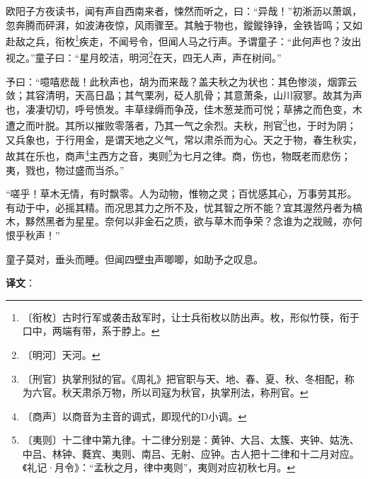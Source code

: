 \documentclass[12pt,UTF-8,openany,a4]{ctexbook}
\begin{document}
\begin{large}
    
    欧阳子方夜读书，闻有声自西南来者，悚然而听之，曰：“异哉！”初淅沥以萧飒，忽奔腾而砰湃，如波涛夜惊，风雨骤至。其触于物也，鏦鏦铮铮，金铁皆鸣；又如赴敌之兵，衔枚\footnote{〔衔枚〕\yiwen 古时行军或袭击敌军时，让士兵衔枚以防出声。枚，形似竹筷，衔于口中，两端有带，系于脖上。}疾走，不闻号令，但闻人马之行声。予谓童子：“此何声也？汝出视之。”童子曰：“星月皎洁，明河\footnote{〔明河〕\yiwen 天河。}在天，四无人声，声在树间。”
    
    予曰：“噫嘻悲哉！此秋声也，胡为而来哉？盖夫秋之为状也：其色惨淡，烟霏云敛；其容清明，天高日晶；其气栗冽，砭人肌骨；其意萧条，山川寂寥。故其为声也，凄凄切切，呼号愤发。丰草绿缛而争茂，佳木葱茏而可悦；草拂之而色变，木遭之而叶脱。其所以摧败零落者，乃其一气之余烈。夫秋，刑官\footnote{〔刑官〕\yiwen 执掌刑狱的官。《周礼》把官职与天、地、春、夏、秋、冬相配，称为六官。秋天肃杀万物，所以司寇为秋官，执掌刑法，称刑官。}也，于时为阴；又兵象也，于行用金，是谓天地之义气，常以肃杀而为心。天之于物，春生秋实，故其在乐也，商声\footnote{〔商声〕\yiwen 以商音为主音的调式，即现代的D小调。}主西方之音，夷则\footnote{〔夷则〕\yiwen 十二律中第九律。十二律分别是：黄钟、大吕、太簇、夹钟、姑洗、中吕、林钟、蕤宾、夷则、南吕、无射、应钟。古人把十二律和十二月对应。《礼记·月令》：“孟秋之月，律中夷则”，夷则对应初秋七月。}为七月之律。商，伤也，物既老而悲伤；夷，戮也，物过盛而当杀。”
    
    “嗟乎！草木无情，有时飘零。人为动物，惟物之灵；百忧感其心，万事劳其形。有动于中，必摇其精。而况思其力之所不及，忧其智之所不能？宜其渥然丹者为槁木，黟然黑者为星星。奈何以非金石之质，欲与草木而争荣？念谁为之戕贼，亦何恨乎秋声！”
    
    童子莫对，垂头而睡。但闻四壁虫声唧唧，如助予之叹息。

\end{large}


\newpage

\begin{Large}
   \noindent \textbf{译文}：
\end{Large}

\vspace{1em}
\end{document}

